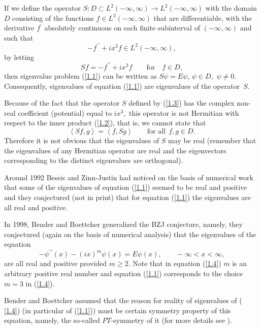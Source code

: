\documentclass[11pt]{article}
\numberwithin{equation}{section}
\begin{document}
If we def\/ine the operator $S:D\subset L^{2}(-\infty ,\infty )\rightarrow
L^{2}(-\infty ,\infty )$ with the domain $D$ consisting of the functions $%
f\in L^{2}(-\infty ,\infty )$ that are dif\/ferentiable, with the derivative $%
f^{\prime }$ absolutely continuous on each f\/inite subinterval of $(-\infty
,\infty )$ and such that%
\[
-f^{\prime \prime }+ix^{3}f\in L^{2}(-\infty ,\infty ),
\]%
by letting%
\begin{equation}
Sf=-f^{\prime \prime }+ix^{3}f\qquad \text{for} \quad f\in D,  \label{1.3}
\end{equation}%
then eigenvalue problem (\ref{1.1}) can be written as $S\psi =E\psi $, $\psi
\in D,$ $\psi \neq 0.$ Consequently, eigenvalues of equation (\ref{1.1}) are
eigenvalues of the operator~$S$.

Because of the fact that the operator $S$ def\/ined by (\ref{1.3}) has the
complex non-real coef\/f\/icient (potential) equal to $ix^{3},$ this operator is
not Hermitian with respect to the inner product (\ref{1.2}), that is, we
cannot state that%
\[
\left\langle Sf,g\right\rangle =\left\langle f,Sg\right\rangle \qquad \text{for all} \ \ f,g\in D.
\]%
Therefore it is not obvious that the eigenvalues of $S$ may be real
(remember that the eigenvalues of any Hermitian operator are real and the
eigenvectors corresponding to the distinct eigenvalues are orthogonal).

Around 1992 Bessis and Zinn-Justin had noticed on the basis of numerical
work that some of the eigenvalues of equation (\ref{1.1}) seemed to be real
and positive and they conjectured (not in print) that for equation (\ref{1.1}) the eigenvalues are all real and positive.

In 1998, Bender and Boettcher \cite{[2]} generalized the BZJ conjecture,
namely, they conjectured (again on the basis of numerical analysis) that the
eigenvalues of the equation%
\begin{equation}
-\psi ^{\prime \prime }(x)-(ix)^{m}\psi (x)=E\psi (x),\qquad -\infty
<x<\infty ,  \label{1.4}
\end{equation}%
are all real and positive provided $m\geq 2.$ Note that in equation (\ref{1.4}) $m$ is an arbitrary positive real number and equation (\ref{1.1})
corresponds to the choice $m=3$ in (\ref{1.4}).

Bender and Boettcher assumed that the reason for reality of eigenvalues of (%
\ref{1.4}) (in particular of (\ref{1.1})) must be certain symmetry property
of this equation, namely, the so-called $PT$-symmetry of it (for more
details see \cite{[1]}).
\end{document}
